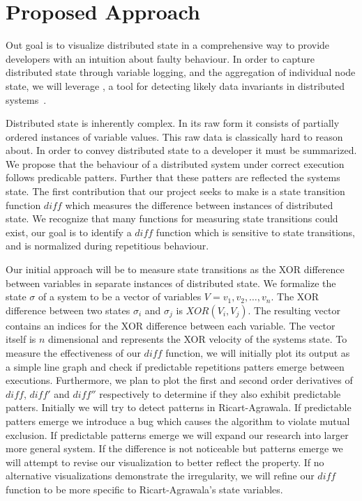 \section{Proposed Approach}
\label{sec:proposed-approach}

Out goal is to visualize distributed state in a comprehensive way to
provide developers with an intuition about faulty behaviour. In order
to capture distributed state through variable logging, and the
aggregation of individual node state, we will leverage \dinv, a tool
for detecting likely data invariants in distributed
systems~\cite{dinv}.

Distributed state is inherently complex. In its raw form it consists
of partially ordered instances of variable values. This raw data is
classically hard to reason about. In order to convey distributed state
to a developer it must be summarized. We propose that the behaviour of
a distributed system under correct execution follows predicable
patters. Further that these patters are reflected the systems state.
The first contribution that our project seeks to make is a state
transition function $diff$ which measures the difference between
instances of distributed state. We recognize that many functions for
measuring state transitions could exist, our goal is to identify a
$diff$ function which is sensitive to state transitions, and is
normalized during repetitious behaviour.

Our initial approach will be to measure state transitions as the XOR
difference between variables in separate instances of distributed
state. We formalize the state $\sigma$ of a system to be a vector of
variables $V = {v_1,v_2,\dots,v_n}$. The XOR difference between two
states $\sigma_i$ and $\sigma_j$ is $XOR(V_i,V_j)$. The resulting
vector contains an indices for the XOR difference between each
variable. The vector itself is $n$ dimensional and represents the XOR
velocity of the systems state. To measure the effectiveness of our
$diff$ function, we will initially plot its output as a simple line
graph and check if predictable repetitions patters emerge between
executions.  Furthermore, we plan to plot the first and second order
derivatives of $diff$, $diff'$ and $diff''$ respectively to determine
if they also exhibit predictable patters. Initially we will try to
detect patterns in Ricart-Agrawala. If predictable patters emerge we
introduce a bug which causes the algorithm to violate mutual
exclusion. If predictable patterns emerge we will expand our research
into larger more general system. If the difference is not noticeable
but patterns emerge we will attempt to revise our visualization to
better reflect the property. If no alternative visualizations
demonstrate the irregularity, we will refine our $diff$ function to be
more specific to Ricart-Agrawala's state variables.

